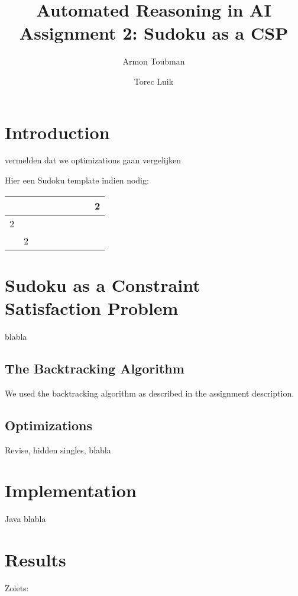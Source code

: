 \documentclass[11pt]{article} %
\title{Automated Reasoning in AI\\
Assignment 2: Sudoku as a CSP}
\author{Armon Toubman \and Torec Luik}
\begin{document}
\maketitle

\section{Introduction}

vermelden dat we optimizations gaan vergelijken

Hier een Sudoku template indien nodig:

\begin{center}
\begin{tabular}{|c|c|c||c|c|c||c|c|c|}
\hline
 &  &  &  &  &  &  &  & 2 \\
\hline
2 &  &  &  &  &  &  &  &  \\
\hline
 & 2 &  &  &  &  &  &  &  \\
\hline
\end{tabular}
\end{center}

\section{Sudoku as a Constraint Satisfaction Problem}

blabla

\subsection{The Backtracking Algorithm}

We used the backtracking algorithm as described in the assignment description.

\subsection{Optimizations}

Revise, hidden singles, blabla

\section{Implementation}

Java blabla

\section{Results}

Zoiets:
\end{document}
